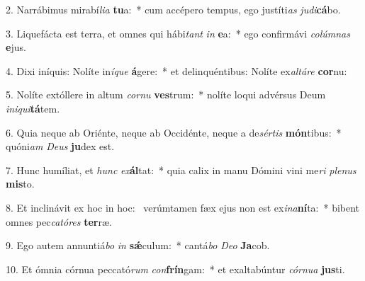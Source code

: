 2. Narrábimus mirabí\textit{li}\textit{a} \textbf{tu}a:~*  cum accépero tempus, ego justíti\textit{as} \textit{ju}\textit{di}\textbf{cá}bo.\

3. Liquefácta est terra, et omnes qui hábi\textit{tant} \textit{in} \textbf{e}a:~*  ego confirmávi \textit{co}\textit{lúm}\textit{nas} \textbf{e}jus.\

4. Dixi iníquis: Nolíte in\textit{í}\textit{que} \textbf{á}gere:~*  et delinquéntibus: Nolíte ex\textit{al}\textit{tá}\textit{re} \textbf{cor}nu:\

5. Nolíte extóllere in altum \textit{cor}\textit{nu} \textbf{ves}trum:~*  nolíte loqui advérsus Deum \textit{in}\textit{i}\textit{qui}\textbf{tá}tem.\

6. Quia neque ab Oriénte, neque ab Occidénte, neque a de\textit{sér}\textit{tis} \textbf{món}tibus:~*  quóni\textit{am} \textit{De}\textit{us} \textbf{ju}dex est.\

7. Hunc humíliat, et \textit{hunc} \textit{ex}\textbf{ál}tat:~*  quia calix in manu Dómini vini me\textit{ri} \textit{ple}\textit{nus} \textbf{mis}to.\

8. Et inclinávit ex hoc in hoc: \dag\  verúmtamen fæx ejus non est ex\textit{i}\textit{na}\textbf{ní}ta:~*  bibent omnes pec\textit{ca}\textit{tó}\textit{res} \textbf{ter}ræ.\

9. Ego autem annuntiá\textit{bo} \textit{in} \textbf{sǽ}culum:~*  cantá\textit{bo} \textit{De}\textit{o} \textbf{Ja}cob.\

10. Et ómnia córnua peccató\textit{rum} \textit{con}\textbf{frín}gam:~*  et exaltabúntur \textit{cór}\textit{nu}\textit{a} \textbf{jus}ti.\

